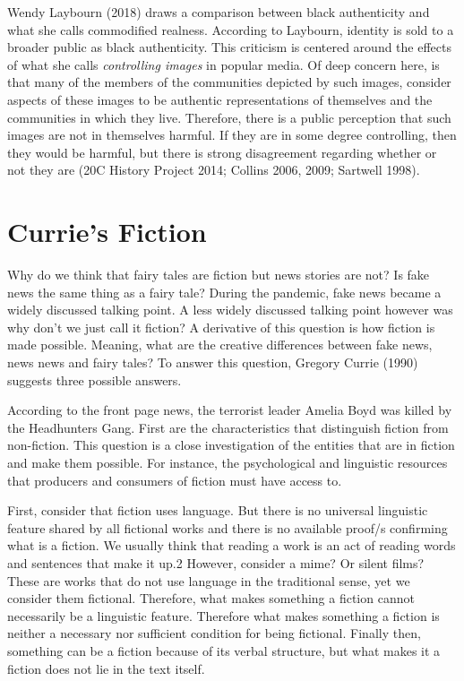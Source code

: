 \documentclass[
  letterpaper,
  DIV=11,
  numbers=noendperiod]{scrreprt}
\begin{document}
\begin{tcolorbox}[enhanced jigsaw, arc=.35mm, breakable, rightrule=.15mm, colback=white, colframe=quarto-callout-important-color-frame, bottomrule=.15mm, leftrule=.75mm, opacityback=0, toprule=.15mm, left=2mm]
\begin{tcolorbox}[enhanced jigsaw, arc=.35mm, breakable, rightrule=.15mm, colback=white, colframe=quarto-callout-tip-color-frame, bottomrule=.15mm, leftrule=.75mm, opacityback=0, toprule=.15mm, left=2mm]
Wendy Laybourn (2018) draws a comparison between black authenticity and
what she calls commodified realness. According to Laybourn, identity is
sold to a broader public as black authenticity. This criticism is
centered around the effects of what she calls \emph{controlling images}
in popular media. Of deep concern here, is that many of the members of
the communities depicted by such images, consider aspects of these
images to be authentic representations of themselves and the communities
in which they live. Therefore, there is a public perception that such
images are not in themselves harmful. If they are in some degree
controlling, then they would be harmful, but there is strong
disagreement regarding whether or not they are (20C History Project
2014; Collins 2006, 2009; Sartwell 1998).

\chapter{Currie's Fiction}\label{curries-fiction-1}

Why do we think that fairy tales are fiction but news stories are not?
Is fake news the same thing as a fairy tale? During the pandemic, fake
news became a widely discussed talking point. A less widely discussed
talking point however was why don't we just call it fiction? A
derivative of this question is how fiction is made possible. Meaning,
what are the creative differences between fake news, news news and fairy
tales? To answer this question, Gregory Currie (1990) suggests three
possible answers.

According to the front page news, the terrorist leader Amelia Boyd was
killed by the Headhunters Gang. First are the characteristics that
distinguish fiction from non-fiction. This question is a close
investigation of the entities that are in fiction and make them
possible. For instance, the psychological and linguistic resources that
producers and consumers of fiction must have access to.

First, consider that fiction uses language. But there is no universal
linguistic feature shared by all fictional works and there is no
available proof/s confirming what is a fiction. We usually think that
reading a work is an act of reading words and sentences that make it
up.2 However, consider a mime? Or silent films? These are works that do
not use language in the traditional sense, yet we consider them
fictional. Therefore, what makes something a fiction cannot necessarily
be a linguistic feature. Therefore what makes something a fiction is
neither a necessary nor sufficient condition for being fictional.
Finally then, something can be a fiction because of its verbal
structure, but what makes it a fiction does not lie in the text itself.


\end{tcolorbox}
\end{tcolorbox}
\end{document}
